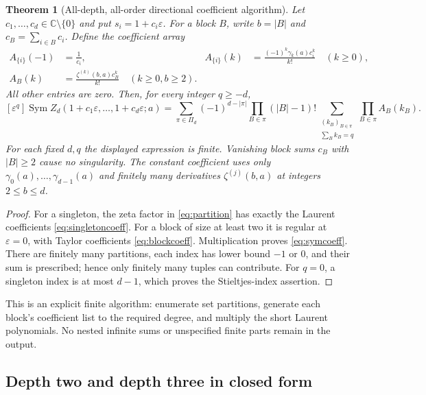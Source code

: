 \documentclass[11pt,letterpaper]{article}
\numberwithin{equation}{section}
\theoremstyle{plain}
\newtheorem{theorem}{Theorem}[section]
\theoremstyle{definition}
\theoremstyle{remark}
\DeclareMathOperator{\Sym}{Sym}
\newcommand{\C}{\mathbb C}
\newcommand{\eps}{\varepsilon}
\begin{document}
\begin{theorem}[All-depth, all-order directional coefficient algorithm]
\label{thm:symcoeff}
Let $c_1,\ldots,c_d\in\C\setminus\{0\}$ and put
$s_i=1+c_i\eps$. For a block $B$, write $b=|B|$ and
$c_B=\sum_{i\in B}c_i$. Define the coefficient array
\begin{align}
 A_{\{i\}}(-1)&=\frac1{c_i},&
 A_{\{i\}}(k)&=\frac{(-1)^k\gamma_k(a)c_i^k}{k!}\quad(k\ge0),
 \label{eq:singletoncoeff}\\
 A_B(k)&=\frac{\zeta^{(k)}(b,a)c_B^k}{k!}\quad(k\ge0, b\ge2).
 \label{eq:blockcoeff}
\end{align}
All other entries are zero. Then, for every integer $q\ge-d$,
\begin{equation}\label{eq:symcoeff}
 \boxed{
 [\eps^q]\Sym Z_d(1+c_1\eps,\ldots,1+c_d\eps;a)
 =\sum_{\pi\in\Pi_d}(-1)^{d-|\pi|}
       \prod_{B\in\pi}(|B|-1)!
       \sum_{\substack{(k_B)_{B\in\pi}\\\sum_Bk_B=q}}
                     \prod_{B\in\pi}A_B(k_B).}
\end{equation}
For each fixed $d,q$ the displayed expression is finite. Vanishing
block sums $c_B$ with $|B|\ge2$ cause no singularity. The constant
coefficient uses only $\gamma_0(a),\ldots,\gamma_{d-1}(a)$ and
finitely many derivatives $\zeta^{(j)}(b,a)$ at integers $2\le b\le d$.
\end{theorem}
\begin{proof}
For a singleton, the zeta factor in \eqref{eq:partition} has exactly
the Laurent coefficients \eqref{eq:singletoncoeff}. For a block of
size at least two it is regular at $\eps=0$, with Taylor coefficients
\eqref{eq:blockcoeff}. Multiplication proves \eqref{eq:symcoeff}.
There are finitely many partitions, each index has lower bound $-1$
or $0$, and their sum is prescribed; hence only finitely many tuples
can contribute. For $q=0$, a singleton index is at most $d-1$,
which proves the Stieltjes-index assertion.
\end{proof}

This is an explicit finite algorithm: enumerate set partitions,
generate each block's coefficient list to the required degree, and
multiply the short Laurent polynomials. No nested infinite sums or
unspecified finite parts remain in the output.

\subsection{Depth two and depth three in closed form}
\end{document}
